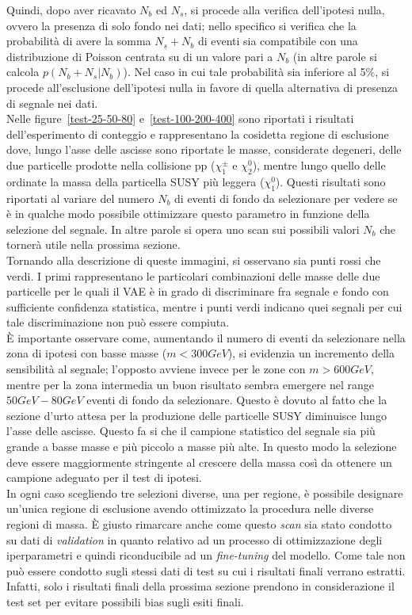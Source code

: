 Quindi, dopo aver ricavato $N_b$ ed $N_s$, si procede alla verifica dell'ipotesi nulla, ovvero la presenza di solo fondo nei dati; nello specifico si verifica che la probabilità di avere la somma $N_s + N_b$ di eventi sia compatibile con una distribuzione di Poisson centrata su di un valore pari a $N_b$ (in altre parole si calcola $p(N_b + N_s | N_b)$). Nel caso in cui tale probabilità sia inferiore al 5\%, si procede all'esclusione dell'ipotesi nulla in favore di quella alternativa di presenza di segnale nei dati.\\
Nelle figure~\ref{test-25-50-80} e~\ref{test-100-200-400} sono riportati i risultati dell'esperimento di conteggio e rappresentano la cosidetta regione di esclusione dove, lungo l'asse delle ascisse sono riportate le masse, considerate degeneri, delle due particelle prodotte nella collisione pp ($\chi^\pm_1$ e $\chi^0_2$), mentre lungo quello delle ordinate la massa della particella SUSY più leggera ($\chi^0_1$). Questi risultati sono riportati al variare del numero $N_{b}$ di eventi di fondo da selezionare per vedere se è in qualche modo possibile ottimizzare questo parametro in funzione della selezione del segnale. In altre parole si opera uno scan sui possibili valori $N_{b}$ che tornerà utile nella prossima sezione.\\
Tornando alla descrizione di queste immagini, si osservano sia punti rossi che verdi. I primi rappresentano le particolari combinazioni delle masse delle due particelle per le quali il VAE è in grado di discriminare fra segnale e fondo con sufficiente confidenza statistica, mentre i punti verdi indicano  quei segnali per cui tale discriminazione non può essere compiuta.\\
È importante osservare come, aumentando il numero di eventi da selezionare nella zona di ipotesi con basse masse ($m < 300 GeV$), si evidenzia un incremento della sensibilità al segnale; l'opposto avviene invece per le zone con $m > 600 GeV$, mentre per la zona intermedia un buon risultato sembra emergere nel range $50 GeV - 80 GeV$ eventi di fondo da selezionare. Questo è dovuto al fatto che la sezione d'urto attesa per la produzione delle particelle SUSY diminuisce lungo l'asse delle ascisse. Questo fa si che il campione statistico del segnale sia più grande a basse masse e più piccolo a masse più alte. In questo modo la selezione deve essere maggiormente stringente al crescere della massa così da ottenere un campione adeguato per il test di ipotesi.\\
In ogni caso scegliendo tre selezioni diverse, una per regione, è possibile designare un'unica regione di esclusione avendo ottimizzato la procedura nelle diverse regioni di massa. È giusto rimarcare anche come questo \textit{scan} sia stato condotto su dati di \textit{validation} in quanto relativo ad un processo di ottimizzazione degli iperparametri e quindi riconducibile ad un \textit{fine-tuning} del modello. Come tale non può essere condotto sugli stessi dati di test su cui i risultati finali verrano estratti. Infatti, solo i risultati finali della prossima sezione prendono in considerazione il test set per evitare possibili bias sugli esiti finali.

